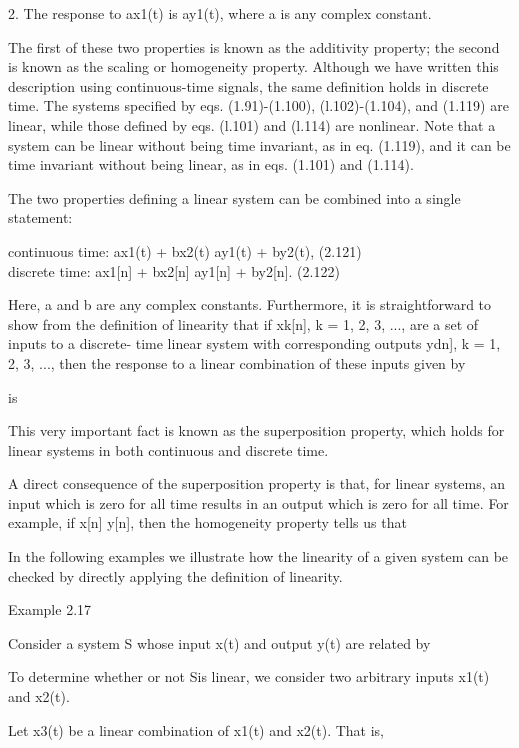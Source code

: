 \documentclass{report}
\begin{document}
2. The response to ax1(t) is ay1(t), where a is any complex constant.

The first of these two properties is known as the additivity property; the second is known as the scaling or homogeneity property. Although we have
written this description using continuous-time signals, the same definition holds in discrete time. The systems specified by eqs. (1.91)-(1.100),
(l.102)-(1.104), and (1.119) are linear, while those defined by eqs. (l.101) and (l.114) are nonlinear. Note that a system can be linear without
being time invariant, as in eq. (1.119), and it can be time invariant without being linear, as in eqs. (1.101) and (1.114).

The two properties defining a linear system can be combined into a single statement: 

continuous time: ax1(t) + bx2(t) { } ay1(t) + by2(t), (2.121)\\
discrete time: ax1[n] + bx2[n] { } ay1[n] + by2[n]. (2.122)

Here, a and b are any complex constants. Furthermore, it is straightforward to show from the definition of linearity that if xk[n], k = 1, 2, 3,
..., are a set of inputs to a discrete- time linear system with corresponding outputs ydn], k = 1, 2, 3, ..., then the response to a linear combination
of these inputs given by



is



This very important fact is known as the superposition property, which holds for linear systems in both continuous and discrete time.

A direct consequence of the superposition property is that, for linear systems, an input which is zero for all time results in an output which is
zero for all time. For example, if x[n] { } y[n], then the homogeneity property tells us that



In the following examples we illustrate how the linearity of a given system can be checked by directly applying the definition of linearity.

Example 2.17

Consider a system S whose input x(t) and output y(t) are related by



To determine whether or not Sis linear, we consider two arbitrary inputs x1(t) and x2(t).



Let x3(t) be a linear combination of x1(t) and x2(t). That is,
\end{document}
